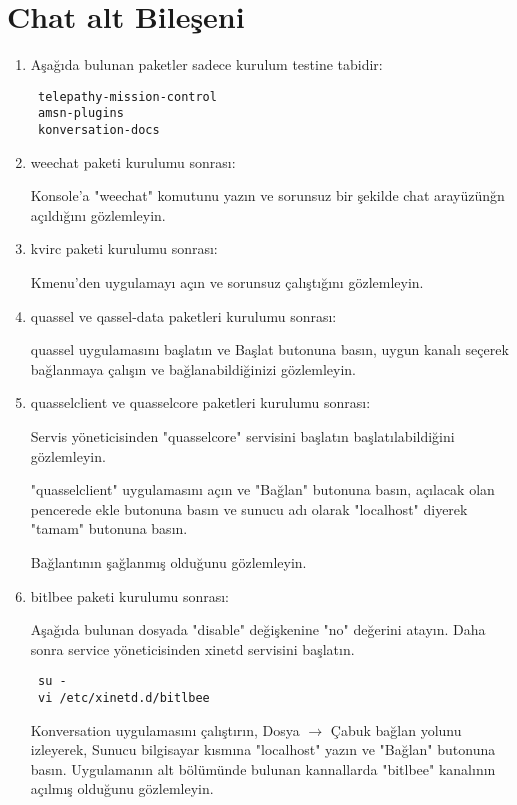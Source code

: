\documentclass[a4paper,10pt]{article}
\begin{document}
\section{Chat alt Bileşeni}
\begin{enumerate}

\item Aşağıda bulunan paketler sadece kurulum testine tabidir:

\begin{verbatim}
 telepathy-mission-control
 amsn-plugins
 konversation-docs 
\end{verbatim}

\item weechat paketi kurulumu sonrası:

Konsole'a "weechat" komutunu yazın ve sorunsuz bir şekilde chat arayüzünğn açıldığını gözlemleyin.

\item kvirc paketi kurulumu sonrası:

Kmenu'den uygulamayı açın ve sorunsuz çalıştığını gözlemleyin.

\item quassel ve qassel-data paketleri kurulumu sonrası:

quassel uygulamasını başlatın ve Başlat butonuna basın, uygun kanalı seçerek bağlanmaya çalışın ve bağlanabildiğinizi gözlemleyin.

\item quasselclient ve quasselcore paketleri kurulumu sonrası:

Servis yöneticisinden "quasselcore" servisini başlatın başlatılabildiğini gözlemleyin.

"quasselclient" uygulamasını açın ve "Bağlan" butonuna basın, açılacak olan pencerede ekle butonuna basın ve sunucu adı olarak "localhost" diyerek "tamam" butonuna basın.

Bağlantının şağlanmış olduğunu gözlemleyin.

\item bitlbee paketi kurulumu sonrası:

Aşağıda bulunan dosyada "disable" değişkenine "no" değerini atayın. Daha sonra service yöneticisinden xinetd servisini başlatın. 
\begin{verbatim}
 su -
 vi /etc/xinetd.d/bitlbee
\end{verbatim}

Konversation uygulamasını çalıştırın, Dosya $\rightarrow$ Çabuk bağlan yolunu izleyerek, Sunucu bilgisayar kısmına "localhost" yazın ve "Bağlan" butonuna basın. Uygulamanın alt bölümünde bulunan kannallarda "bitlbee" kanalının açılmış olduğunu gözlemleyin.


\end{enumerate}
\end{document}
